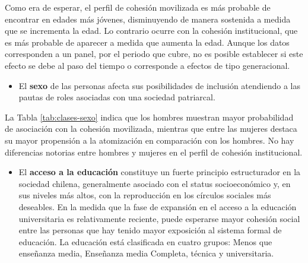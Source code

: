 \documentclass[
  12pt,
]{book}
\providecommand{\tightlist}{%
  \setlength{\itemsep}{0pt}\setlength{\parskip}{0pt}}
\begin{document}
Como era de esperar, el perfil de cohesión movilizada es más probable de encontrar en edades más jóvenes, disminuyendo de manera sostenida a medida que se incrementa la edad. Lo contrario ocurre con la cohesión institucional, que es más probable de aparecer a medida que aumenta la edad. Aunque los datos corresponden a un panel, por el periodo que cubre, no es posible establecer si este efecto se debe al paso del tiempo o corresponde a efectos de tipo generacional.

\begin{itemize}
\tightlist
\item
  El \textbf{sexo} de las personas afecta sus posibilidades de inclusión atendiendo a las pautas de roles asociadas con una sociedad patriarcal.
\end{itemize}

\begin{table}

\caption{\label{tab:clases-sexo}Efecto del sexo sobre las clases de cohesion social}
\centering
{}
\end{table}

La Tabla \ref{tab:clases-sexo} indica que los hombres muestran mayor probabilidad de asociación con la cohesión movilizada, mientras que entre las mujeres destaca su mayor propensión a la atomización en comparación con los hombres. No hay diferencias notorias entre hombres y mujeres en el perfil de cohesión institucional.

\begin{itemize}
\tightlist
\item
  El \textbf{acceso a la educación} constituye un fuerte principio estructurador en la sociedad chilena, generalmente asociado con el status socioeconómico y, en sus niveles más altos, con la reproducción en los círculos sociales más deseables. En la medida que la fase de expansión en el acceso a la educación universitaria es relativamente reciente, puede esperarse mayor cohesión social entre las personas que hay tenido mayor exposición al sistema formal de educación. La educación está clasificada en cuatro grupos: Menos que enseñanza media, Enseñanza media Completa, técnica y universitaria.
\end{itemize}
\end{document}
